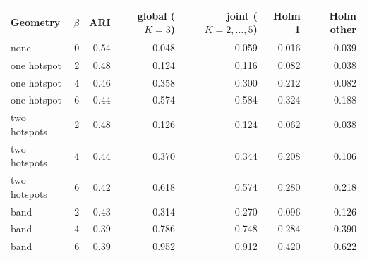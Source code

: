 \begin{tabular}{@{}lrrrrrr@{}}
\toprule
Geometry & $\beta$ & ARI & global ($K=3$) & joint ($K=2,\dots,5$) & Holm 1 & Holm other \\
\midrule
none & 0 & 0.54 & 0.048 & 0.059 & 0.016 & 0.039 \\
one hotspot & 2 & 0.48 & 0.124 & 0.116 & 0.082 & 0.038 \\
one hotspot & 4 & 0.46 & 0.358 & 0.300 & 0.212 & 0.082 \\
one hotspot & 6 & 0.44 & 0.574 & 0.584 & 0.324 & 0.188 \\
two hotspots & 2 & 0.48 & 0.126 & 0.124 & 0.062 & 0.038 \\
two hotspots & 4 & 0.44 & 0.370 & 0.344 & 0.208 & 0.106 \\
two hotspots & 6 & 0.42 & 0.618 & 0.574 & 0.280 & 0.218 \\
band & 2 & 0.43 & 0.314 & 0.270 & 0.096 & 0.126 \\
band & 4 & 0.39 & 0.786 & 0.748 & 0.284 & 0.390 \\
band & 6 & 0.39 & 0.952 & 0.912 & 0.420 & 0.622 \\
\bottomrule
\end{tabular}
